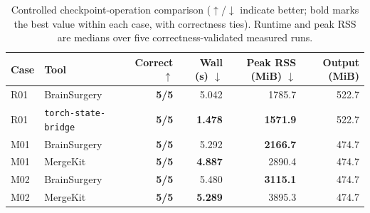 \begin{table}[t]
\centering
\small
\begin{tabular}{llrrrr}
\toprule
\textbf{Case} & \textbf{Tool} & \textbf{Correct $\uparrow$} & \textbf{Wall (s) $\downarrow$} & \textbf{Peak RSS (MiB) $\downarrow$} & \textbf{Output (MiB)} \\
\midrule
R01 & BrainSurgery & \textbf{5/5} & 5.042 & 1785.7 & 522.7 \\
R01 & \texttt{torch-state-bridge} & \textbf{5/5} & \textbf{1.478} & \textbf{1571.9} & 522.7 \\
M01 & BrainSurgery & \textbf{5/5} & 5.292 & \textbf{2166.7} & 474.7 \\
M01 & MergeKit & \textbf{5/5} & \textbf{4.887} & 2890.4 & 474.7 \\
M02 & BrainSurgery & \textbf{5/5} & 5.480 & \textbf{3115.1} & 474.7 \\
M02 & MergeKit & \textbf{5/5} & \textbf{5.289} & 3895.3 & 474.7 \\
\bottomrule
\end{tabular}
\caption{Controlled checkpoint-operation comparison ($\uparrow$/$\downarrow$ indicate better; bold marks the best value within each case, with correctness ties). Runtime and peak RSS are medians over five correctness-validated measured runs.}
\label{tab:competing-tools}
\end{table}
